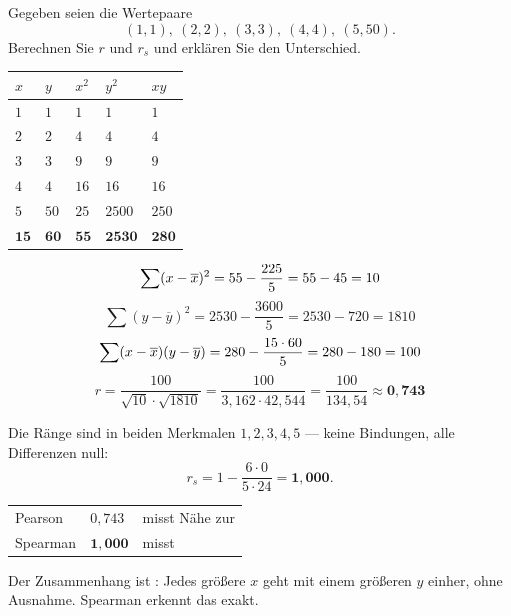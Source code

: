 \begin{aufgabe}
Gegeben seien die Wertepaare
\[ (1,1),\ (2,2),\ (3,3),\ (4,4),\ (5,50) . \]
Berechnen Sie $r$ und $r_s$ und erklären Sie den Unterschied.

\loesung
{}
\begin{center}
{\small
\renewcommand{\arraystretch}{1.3}
\begin{tabular}{@{}P{1.0cm}P{1.2cm}P{1.2cm}P{1.4cm}P{1.4cm}@{}}
\toprule
$x$ & $y$ & $x^2$ & $y^2$ & $xy$\\
\midrule
$1$ & $1$ & $1$ & $1$ & $1$\\
$2$ & $2$ & $4$ & $4$ & $4$\\
$3$ & $3$ & $9$ & $9$ & $9$\\
$4$ & $4$ & $16$ & $16$ & $16$\\
$5$ & $50$ & $25$ & $2500$ & $250$\\
\midrule
$\mathbf{15}$ & $\mathbf{60}$ & $\mathbf{55}$ & $\mathbf{2530}$ & $\mathbf{280}$\\
\bottomrule
\end{tabular}}
\end{center}

\[ \sum(x-\overline{x})^2 = 55 - \frac{225}{5} = 55 - 45 = 10 \]
\[ \sum(y-\overline y)^2 = 2530 - \frac{3600}{5} = 2530 - 720 = 1810 \]
\[ \sum(x-\overline{x})(y-\overline y) = 280 - \frac{15 \cdot 60}{5} = 280 - 180 = 100 \]
\[ r = \frac{100}{\sqrt{10}\cdot\sqrt{1810}} = \frac{100}{3{,}162 \cdot 42{,}544} = \frac{100}{134{,}54} \approx \mathbf{0{,}743} \]

Die Ränge sind in beiden Merkmalen $1,2,3,4,5$ --- keine Bindungen, alle Differenzen null:
\[ r_s = 1 - \frac{6 \cdot 0}{5 \cdot 24} = \mathbf{1{,}000} . \]

\begin{center}
\renewcommand{\arraystretch}{1.48}
\begin{tabular}{@{}P{2.4cm}P{1.8cm}P{4.0cm}@{}}
\toprule
Pearson & $0{,}743$ & misst Nähe zur \\
Spearman & $\mathbf{1{,}000}$ & misst \\
\bottomrule
\end{tabular}
\end{center}

Der Zusammenhang ist : Jedes größere $x$ geht mit einem größeren $y$ einher, ohne Ausnahme. Spearman erkennt das exakt.


\end{aufgabe}
